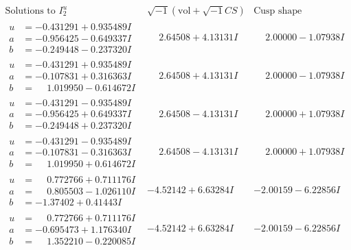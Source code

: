 \documentclass[1p]{elsarticle_modified}
\theoremstyle{definition}
\newcommand{\I}{\sqrt{-1}}
\begin{document}
$$\begin{array}{c|c|c}  
\text{Solutions to }I^u_{2}& \I (\text{vol} + \sqrt{-1}CS) & \text{Cusp shape}\\
 \hline 
\begin{aligned}
u &= -0.431291 + 0.935489 I \\
a &= -0.956425 - 0.649337 I \\
b &= -0.249448 - 0.237320 I\end{aligned}
 & \phantom{-}2.64508 + 4.13131 I & \phantom{-}2.00000 - 1.07938 I \\ \hline\begin{aligned}
u &= -0.431291 + 0.935489 I \\
a &= -0.107831 + 0.316363 I \\
b &= \phantom{-}1.019950 - 0.614672 I\end{aligned}
 & \phantom{-}2.64508 + 4.13131 I & \phantom{-}2.00000 - 1.07938 I \\ \hline\begin{aligned}
u &= -0.431291 - 0.935489 I \\
a &= -0.956425 + 0.649337 I \\
b &= -0.249448 + 0.237320 I\end{aligned}
 & \phantom{-}2.64508 - 4.13131 I & \phantom{-}2.00000 + 1.07938 I \\ \hline\begin{aligned}
u &= -0.431291 - 0.935489 I \\
a &= -0.107831 - 0.316363 I \\
b &= \phantom{-}1.019950 + 0.614672 I\end{aligned}
 & \phantom{-}2.64508 - 4.13131 I & \phantom{-}2.00000 + 1.07938 I \\ \hline\begin{aligned}
u &= \phantom{-}0.772766 + 0.711176 I \\
a &= \phantom{-}0.805503 - 1.026110 I \\
b &= -1.37402 + 0.41443 I\end{aligned}
 & -4.52142 + 6.63284 I & -2.00159 - 6.22856 I \\ \hline\begin{aligned}
u &= \phantom{-}0.772766 + 0.711176 I \\
a &= -0.695473 + 1.176340 I \\
b &= \phantom{-}1.352210 - 0.220085 I\end{aligned}
 & -4.52142 + 6.63284 I & -2.00159 - 6.22856 I \\ \hline\begin{aligned}

\end{aligned}
\end{array}$$
\end{document}
